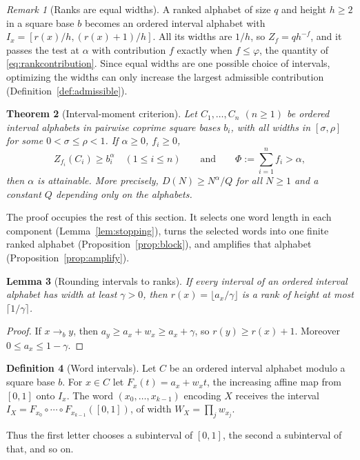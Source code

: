 \documentclass[11pt]{article}
\newtheorem{theorem}{Theorem}[section]
\newtheorem{lemma}[theorem]{Lemma}
\theoremstyle{definition}
\newtheorem{definition}[theorem]{Definition}
\theoremstyle{remark}
\newtheorem{remark}[theorem]{Remark}
\begin{document}
\begin{remark}[Ranks are equal widths]\label{rem:ranked}
A ranked alphabet of size $q$ and height $h\ge2$ in a square base $b$ becomes
an ordered interval alphabet with $I_x=[r(x)/h,(r(x)+1)/h]$. All its widths
are $1/h$, so $Z_f=qh^{-f}$, and it passes the test at $\alpha$ with
contribution $f$ exactly when $f\le\varphi$, the quantity of
\eqref{eq:rankcontribution}. Since equal widths are one possible choice of
intervals, optimizing the widths can only increase the largest admissible
contribution (Definition~\ref{def:admissible}).
\end{remark}


\begin{theorem}[Interval-moment criterion]\label{thm:criterion}
Let $C_1,\ldots,C_n$ $(n\ge1)$ be ordered interval alphabets in pairwise
coprime square bases $b_i$, with all widths in $[\sigma,\rho]$ for some
$0<\sigma\le\rho<1$. If $\alpha\ge0$, $f_i\ge0$,
\[
 Z_{f_i}(C_i)\ge b_i^\alpha\quad(1\le i\le n)
 \qquad\text{and}\qquad \Phi:=\sum_{i=1}^nf_i>\alpha,
\]
then $\alpha$ is attainable. More precisely, $D(N)\ge N^\alpha/Q$ for all
$N\ge1$ and a constant $Q$ depending only on the alphabets.
\end{theorem}
The proof occupies the rest of this section. It selects one word length in
each component (Lemma~\ref{lem:stopping}), turns the selected words into one
finite ranked alphabet (Proposition~\ref{prop:block}), and amplifies that
alphabet (Proposition~\ref{prop:amplify}).

\begin{lemma}[Rounding intervals to ranks]\label{lem:round}
If every interval of an ordered interval alphabet has width at least
$\gamma>0$, then $r(x)=\lfloor a_x/\gamma\rfloor$ is a rank of height at most
$\lceil1/\gamma\rceil$.
\end{lemma}
\begin{proof}
If $x\to_by$, then $a_y\ge a_x+w_x\ge a_x+\gamma$, so $r(y)\ge r(x)+1$.
Moreover $0\le a_x\le1-\gamma$.
\end{proof}

\begin{definition}[Word intervals]\label{def:wordint}
Let $C$ be an ordered interval alphabet modulo a square base $b$. For $x\in C$
let $F_x(t)=a_x+w_xt$, the increasing affine map from $[0,1]$ onto $I_x$. The
word $(x_0,\ldots,x_{k-1})$ encoding $X$ receives the interval
$I_X=F_{x_0}\circ\cdots\circ F_{x_{k-1}}([0,1])$, of width
$W_X=\prod_jw_{x_j}$.
\end{definition}
Thus the first letter chooses a subinterval of $[0,1]$, the second a
subinterval of that, and so on.
\end{document}
